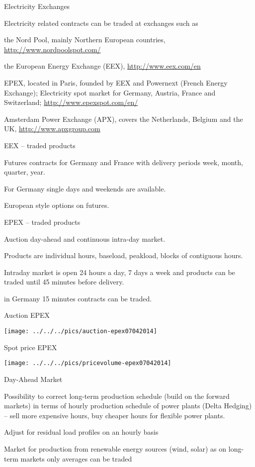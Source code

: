
{Electricity Exchanges}

Electricity related contracts  can be traded at exchanges such as
\item<1-> the Nord Pool, mainly Northern European countries, \url{http://www.nordpoolspot.com/}
\item<2-> the European Energy Exchange (EEX), \url{http://www.eex.com/en}
\item<3-> EPEX, located in Paris, founded by EEX and Powernext (French Energy Exchange);
Electricity spot market for Germany, Austria, France and Switzerland;
\url{http://www.epexspot.com/en/}
\item<4-> Amsterdam Power Exchange (APX), covers the Netherlands, Belgium and the UK, \url{http://www.apxgroup.com}

{EEX -- traded products}
\item<1-> Futures contracts for Germany and France with delivery periods week, month, quarter, year.
\item<2-> For Germany single days and weekends are available.
\item<3-> European style options on futures.

{EPEX -- traded products}
\item<1-> Auction day-ahead and continuous intra-day market.
\item<2-> Products are individual hours, baseload, peakload, blocks of contiguous hours.
\item<3-> Intraday market is open 24 hours a day, 7 days a week and products can be traded until 45 minutes before delivery.
\item<4-> in Germany 15 minutes contracts can be traded.

{Auction EPEX}
\begin{center}
\texttt{[image: ../../../pics/auction-epex07042014]}
\end{center}

{Spot price EPEX}
\begin{center}
\texttt{[image: ../../../pics/pricevolume-epex07042014]}
\end{center}

{Day-Ahead Market }
\item<1-> Possibility to correct long-term production schedule  (build on the forward markets) in terms of hourly production schedule of power plants (Delta Hedging) -- sell more expensive hours, buy cheaper hours for flexible power plants.
\item<2-> Adjust for residual load profiles on an hourly basis
\item<3-> Market for production from renewable energy sources (wind, solar) as on long-term markets only averages can be traded

